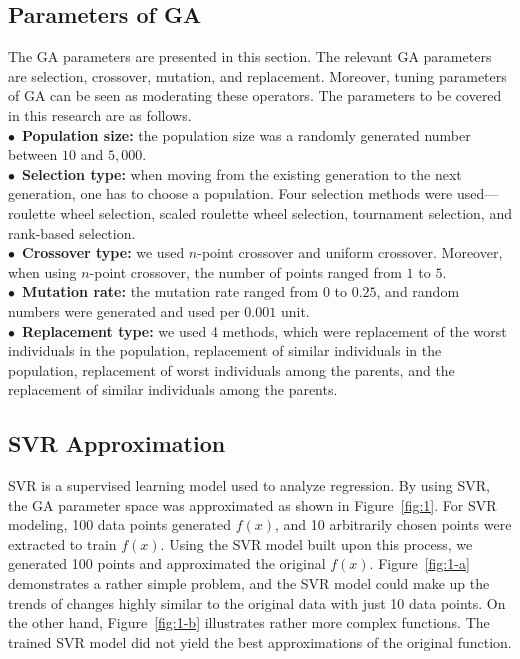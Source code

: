   \subsection{Parameters of GA}
    \label{sec:parameters-ga}
    The GA parameters are presented in this section. The relevant GA parameters are selection, crossover, mutation, and replacement. Moreover, tuning parameters of GA can be seen as moderating these operators. The parameters to be covered in this research are as follows. \\
    $\bullet$~\textbf{Population size:} the population size was a randomly generated number between $10$ and $5,000$. \\
    $\bullet$~\textbf{Selection type:} when moving from the existing generation to the next generation, one has to choose a population. Four selection methods were used---roulette wheel selection, scaled roulette wheel selection, tournament selection, and rank-based selection. \\
    $\bullet$~\textbf{Crossover type:} we used $n$-point crossover and uniform crossover. Moreover, when using $n$-point crossover, the number of points ranged from $1$ to $5$. \\
    $\bullet$~\textbf{Mutation rate:} the mutation rate ranged from $0$ to $0.25$, and random numbers were generated and used per $0.001$ unit. \\
    $\bullet$~\textbf{Replacement type:} we used 4 methods, which were replacement of the worst individuals in the population, replacement of similar individuals in the population, replacement of worst individuals among the parents, and the replacement of similar individuals among the parents.

  \subsection{SVR Approximation}
    \label{sec:svr-approximation}
    SVR is a supervised learning model used to analyze regression. By using SVR, the GA parameter space was approximated as shown in Figure~\ref{fig:1}. For SVR modeling, 100 data points generated $f(x)$, and 10 arbitrarily chosen points were extracted to train $f(x)$. Using the SVR model built upon this process, we generated 100 points and approximated the original $f(x)$. Figure~\ref{fig:1-a} demonstrates a rather simple problem, and the SVR model could make up the trends of changes highly similar to the original data with just 10 data points. On the other hand, Figure~\ref{fig:1-b} illustrates rather more complex functions. The trained SVR model did not yield the best approximations of the original function.
    
